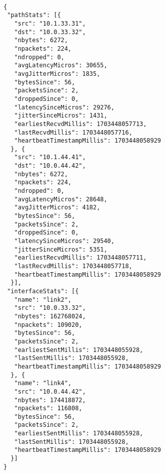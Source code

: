 \begin{lstlisting}[style=json, caption = {Format of Statistics from Data Plane}, label = {lst:stats}]

{
 "pathStats": [{
   "src": "10.1.33.31",
   "dst": "10.0.33.32",
   "nbytes": 6272,
   "npackets": 224,
   "ndropped": 0,
   "avgLatencyMicros": 30655,
   "avgJitterMicros": 1835,
   "bytesSince": 56,
   "packetsSince": 2,
   "droppedSince": 0,
   "latencySinceMicros": 29276,
   "jitterSinceMicros": 1431,
   "earliestRecvdMillis": 1703448057713,
   "lastRecvdMillis": 1703448057716,
   "heartbeatTimestampMillis": 1703448058929
  }, {
   "src": "10.1.44.41",
   "dst": "10.0.44.42",
   "nbytes": 6272,
   "npackets": 224,
   "ndropped": 0,
   "avgLatencyMicros": 28648,
   "avgJitterMicros": 4182,
   "bytesSince": 56,
   "packetsSince": 2,
   "droppedSince": 0,
   "latencySinceMicros": 29540,
   "jitterSinceMicros": 5351,
   "earliestRecvdMillis": 1703448057711,
   "lastRecvdMillis": 1703448057718,
   "heartbeatTimestampMillis": 1703448058929
  }],
 "interfaceStats": [{
   "name": "link2",
   "src": "10.0.33.32",
   "nbytes": 162768024,
   "npackets": 109020,
   "bytesSince": 56,
   "packetsSince": 2,
   "earliestSentMillis": 1703448055928,
   "lastSentMillis": 1703448055928,
   "heartbeatTimestampMillis": 1703448058929
  }, {
   "name": "link4",
   "src": "10.0.44.42",
   "nbytes": 174418872,
   "npackets": 116808,
   "bytesSince": 56,
   "packetsSince": 2,
   "earliestSentMillis": 1703448055928,
   "lastSentMillis": 1703448055928,
   "heartbeatTimestampMillis": 1703448058929
  }]
}


\end{lstlisting}
